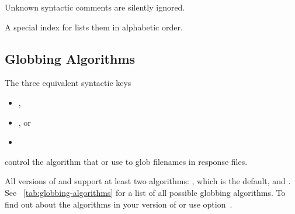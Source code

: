 Unknown syntactic comments are silently ignored.

A special index for  lists them in
alphabetic order.


\subsection[Globbing Algorithms]{\label{sec:globbing-algorithms}%
  Globbing Algorithms}

The three equivalent syntactic keys

\begin{itemize}
\item
  ,

\item
  , or

\item
\end{itemize}

control the algorithm that \App{} or \OtherApp{} use to glob filenames in response files.

%
%
All versions of \App{} and \OtherApp{} support at least two algorithms: , which is
the default, and .  See \tableName~\ref{tab:globbing-algorithms} for a list of
all possible globbing algorithms.  To find out about the algorithms in your version of \App{} or
\OtherApp{} use option~.

